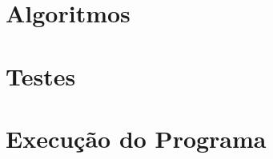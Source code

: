 \documentclass{article}
\begin{document}

\section{Algoritmos}


\section{Testes}


\section{Execução do Programa}

\end{document}
